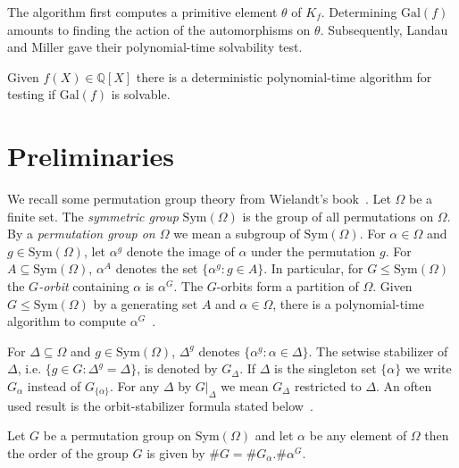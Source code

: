 \documentclass{llncs}
\newcommand{\Gal}[1]{{\ensuremath{\mathrm{Gal}\left(#1\right)}}}
\newcommand{\Sym}[1]{{\ensuremath{\mathrm{Sym}\left(#1\right)}}}
\newcommand{\pr}[2]{{\ensuremath{\left.{#1}\right\vert_{#2}}}}
\newcommand{\Q}{\ensuremath{\mathbb{Q}}}
\begin{document}
The algorithm first computes a primitive element $\theta$ of $K_f$.
Determining $\Gal{f}$ amounts to finding the action of the
automorphisms on $\theta$. Subsequently, Landau and Miller
\cite{landau85solvability} gave their polynomial-time solvability
test.

\begin{theorem}\label{thm-landau-solvability}
  Given $f(X) \in \Q[X]$ there is a deterministic polynomial-time
  algorithm for testing if $\Gal{f}$ is solvable.
\end{theorem}

\section{Preliminaries}
We recall some permutation group theory from Wielandt's
book~\cite{wielandt64finite}. Let $\Omega$ be a finite set. The
\emph{symmetric group} $\Sym{\Omega}$ is the group of all permutations
on $\Omega$.  By a \emph{permutation group on $\Omega$} we mean a
subgroup of $\Sym{\Omega}$. For $\alpha \in \Omega$ and $g \in
\Sym{\Omega}$, let $\alpha^g$ denote the image of $\alpha$ under the
permutation $g$. For $A \subseteq \Sym{\Omega}$, $\alpha^A$ denotes
the set $\{ \alpha^g : g \in A\}$. In particular, for
$G\leq\Sym{\Omega}$ the \emph{$G$-orbit} containing $\alpha$ is
$\alpha^G$. The $G$-orbits form a partition of $\Omega$.  Given
$G\leq\Sym{\Omega}$ by a generating set $A$ and $\alpha \in \Omega$,
there is a polynomial-time algorithm to compute
$\alpha^G$~\cite{luks93permutation}.

For $\Delta \subseteq \Omega$ and $g \in \Sym{\Omega}$, $\Delta^g$
denotes $\{ \alpha^g : \alpha \in \Delta \}$. The setwise stabilizer
of $\Delta$, i.e. $\{ g \in G : \Delta^g = \Delta\}$, is denoted by
$G_\Delta$. If $\Delta$ is the singleton set $\{ \alpha \}$ we write
$G_\alpha$ instead of $G_{\{\alpha\}}$.  For any $\Delta$ by
$\pr{G}{\Delta}$ we mean $G_\Delta$ restricted to $\Delta$. An often
used result is the orbit-stabilizer formula stated below~\cite[Theorem
3.2]{wielandt64finite}.

\begin{theorem}
  Let $G$ be a permutation group on $\Sym{\Omega}$ and let $\alpha$ be
  any element of $\Omega$ then the order of the group $G$ is given by
  $\# G = \# G_\alpha . \# \alpha^G$.
\end{theorem}
\end{document}
